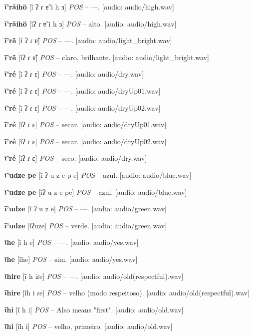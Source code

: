 \textbf{ĩ'rãihö} [ĩ ʔ ɾ ɐ̃ i h ɜ] \textit{POS} -- —. [audio: audio/high.wav]{\faHeadphones}

\textbf{ĩ'rãihö} [ĩʔ ɾ ɐ̃ i h ɜ] \textit{POS} -- alto. [audio: audio/high.wav]{\faHeadphones}

\textbf{ĩ'rã} [ĩ ʔ ɾ ɐ̃] \textit{POS} -- —. [audio: audio/light_bright.wav]{\faHeadphones}

\textbf{ĩ'rã} [ĩʔ ɾ ɐ̃] \textit{POS} -- claro, brilhante. [audio: audio/light_bright.wav]{\faHeadphones}

\textbf{ĩ'ré} [ĩ ʔ ɾ ɛ] \textit{POS} -- —. [audio: audio/dry.wav]{\faHeadphones}

\textbf{ĩ'ré} [ĩ ʔ ɾ ɛ] \textit{POS} -- —. [audio: audio/dryUp01.wav]{\faHeadphones}

\textbf{ĩ'ré} [ĩ ʔ ɾ ɛ] \textit{POS} -- —. [audio: audio/dryUp02.wav]{\faHeadphones}

\textbf{ĩ'ré} [ĩʔ ɾ ɛ] \textit{POS} -- secar. [audio: audio/dryUp01.wav]{\faHeadphones}

\textbf{ĩ'ré} [ĩʔ ɾ ɛ] \textit{POS} -- secar. [audio: audio/dryUp02.wav]{\faHeadphones}

\textbf{ĩ'ré} [ĩʔ ɾ ɛ] \textit{POS} -- seco. [audio: audio/dry.wav]{\faHeadphones}

\textbf{ĩ'udze pe} [ĩ ʔ u z e p e] \textit{POS} -- azul. [audio: audio/blue.wav]{\faHeadphones}

\textbf{ĩ'udze pe} [ĩʔ u z e pe] \textit{POS} -- azul. [audio: audio/blue.wav]{\faHeadphones}

\textbf{ĩ'udze} [ĩ ʔ u z e] \textit{POS} -- —. [audio: audio/green.wav]{\faHeadphones}

\textbf{ĩ'udze} [ĩʔuze] \textit{POS} -- verde. [audio: audio/green.wav]{\faHeadphones}

\textbf{ĩhe} [ĩ h e] \textit{POS} -- —. [audio: audio/yes.wav]{\faHeadphones}

\textbf{ĩhe} [ĩhe] \textit{POS} -- sim. [audio: audio/yes.wav]{\faHeadphones}

\textbf{ĩhire} [ĩ h iɾe] \textit{POS} -- —. [audio: audio/old(respectful).wav]{\faHeadphones}

\textbf{ĩhire} [ĩh i ɾe] \textit{POS} -- velho (modo respeitoso). [audio: audio/old(respectful).wav]{\faHeadphones}

\textbf{ĩhi} [ĩ h i] \textit{POS} -- Also means "first". [audio: audio/old.wav]{\faHeadphones}

\textbf{ĩhi} [ĩh i] \textit{POS} -- velho, primeiro. [audio: audio/old.wav]{\faHeadphones}

